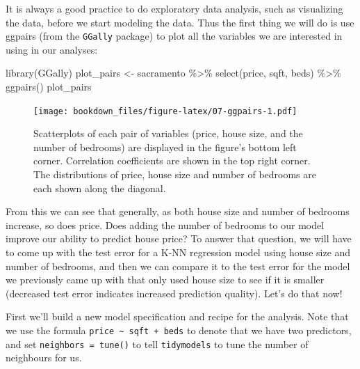 \documentclass[
]{krantz}
\makeatletter
\newenvironment{Shaded}{\begin{snugshade}}{\end{snugshade}}
\newcommand{\FunctionTok}[1]{\textcolor[rgb]{0,0,0}{#1}}
\newcommand{\NormalTok}[1]{#1}
\newcommand{\OtherTok}[1]{\textcolor[rgb]{0.37,0.37,0.37}{#1}}
\newcommand{\SpecialCharTok}[1]{\textcolor[rgb]{0,0,0}{#1}}
\newenvironment{kframe}{%
\medskip{}
\setlength{\fboxsep}{.8em}
 \def\at@end@of@kframe{}%
 \ifinner\ifhmode%
  \def\at@end@of@kframe{\end{minipage}}%
  \begin{minipage}{\columnwidth}%
 \fi\fi%
 \def\FrameCommand##1{\hskip\@totalleftmargin \hskip-\fboxsep
 \colorbox{shadecolor}{##1}\hskip-\fboxsep
     \hskip-\linewidth \hskip-\@totalleftmargin \hskip\columnwidth}%
 \MakeFramed {\advance\hsize-\width
   \@totalleftmargin\z@ \linewidth\hsize
   \@setminipage}}%
 {\par\unskip\endMakeFramed%
 \at@end@of@kframe}
\renewenvironment{Shaded}{\begin{kframe}}{\end{kframe}}
\makeatother
\begin{document}
It is always a good practice to do exploratory data analysis, such as
visualizing the data, before we start modeling the data. Thus the first thing
we will do is use ggpairs (from the \texttt{GGally} package) to plot all the variables
we are interested in using in our analyses:

\begin{Shaded}
\begin{Highlighting}[]
\FunctionTok{library}\NormalTok{(GGally)}
\NormalTok{plot\_pairs }\OtherTok{\textless{}{-}}\NormalTok{ sacramento }\SpecialCharTok{\%\textgreater{}\%}
  \FunctionTok{select}\NormalTok{(price, sqft, beds) }\SpecialCharTok{\%\textgreater{}\%}
  \FunctionTok{ggpairs}\NormalTok{()}
\NormalTok{plot\_pairs}
\end{Highlighting}
\end{Shaded}

\begin{figure}
\centering
\texttt{[image: bookdown\_files/figure-latex/07-ggpairs-1.pdf]}
\caption{\label{fig:07-ggpairs}Scatterplots of each pair of variables (price, house size, and the number of bedrooms) are displayed in the figure's bottom left corner. Correlation coefficients are shown in the top right corner. The distributions of price, house size and number of bedrooms are each shown along the diagonal.}
\end{figure}

From this we can see that generally, as both house size and number of bedrooms increase, so does price. Does adding the number of bedrooms to our model improve our ability to predict house price? To answer that question, we will have to come up with the test error for a K-NN regression model using house size and number of bedrooms, and then we can compare it to the test error for the model we previously came up with that only used house size to see if it is smaller (decreased test error indicates increased prediction quality). Let's do that now!

First we'll build a new model specification and recipe for the analysis. Note that
we use the formula \texttt{price\ \textasciitilde{}\ sqft\ +\ beds} to denote that we have two predictors,
and set \texttt{neighbors\ =\ tune()} to tell \texttt{tidymodels} to tune the number of neighbours for us.
\end{document}
